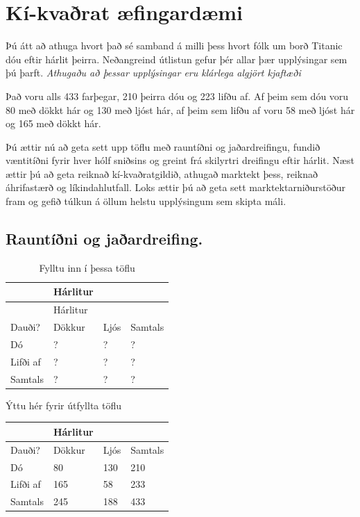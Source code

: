 \documentclass[
]{book}
\begin{document}
\hypertarget{kuxed-kvauxf0rat-uxe6fingarduxe6mi}{%
\chapter{Kí-kvaðrat æfingardæmi}\label{kuxed-kvauxf0rat-uxe6fingarduxe6mi}}

Þú átt að athuga hvort það sé samband á milli þess hvort fólk um borð Titanic dóu eftir hárlit þeirra. Neðangreind útlistun gefur þér allar þær upplýsingar sem þú þarft. \emph{Athugaðu að þessar upplýsingar eru klárlega algjört kjaftæði}

Það voru alls 433 farþegar, 210 þeirra dóu og 223 lifðu af. Af þeim sem dóu voru 80 með dökkt hár og 130 með ljóst hár, af þeim sem lifðu af voru 58 með ljóst hár og 165 með dökkt hár.

Þú ættir nú að geta sett upp töflu með rauntíðni og jaðardreifingu, fundið væntitíðni fyrir hver hólf sniðsins og greint frá skilyrtri dreifingu eftir hárlit. Næst ættir þú að geta reiknað kí-kvaðratgildið, athugað marktekt þess, reiknað áhrifastærð og líkindahlutfall. Loks ættir þú að geta sett marktektarniðurstöður fram og gefið túlkun á öllum helstu upplýsingum sem skipta máli.

\hypertarget{rauntuxeduxf0ni-og-jauxf0ardreifing.}{%
\section{Rauntíðni og jaðardreifing.}\label{rauntuxeduxf0ni-og-jauxf0ardreifing.}}

\begin{longtable}[]{@{}llll@{}}
\caption{Fylltu inn í þessa töflu}\tabularnewline
\toprule()
& Hárlitur & & \\
\midrule()
\endfirsthead
\toprule()
& Hárlitur & & \\
\midrule()
\endhead
Dauði? & Dökkur & Ljós & Samtals \\
Dó & ? & ? & ? \\
Lifði af & ? & ? & ? \\
Samtals & ? & ? & ? \\
\bottomrule()
\end{longtable}

Ýttu hér fyrir útfyllta töflu

\begin{longtable}[]{@{}llll@{}}
\toprule()
& Hárlitur & & \\
\midrule()
\endhead
Dauði? & Dökkur & Ljós & Samtals \\
Dó & 80 & 130 & 210 \\
Lifði af & 165 & 58 & 233 \\
Samtals & 245 & 188 & 433 \\
\bottomrule()
\end{longtable}
\end{document}
